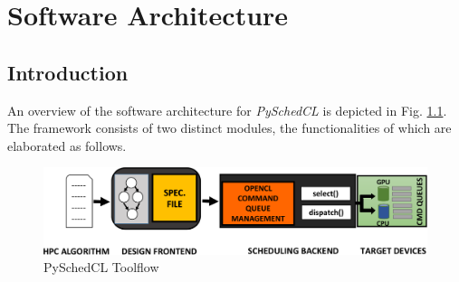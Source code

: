 
\chapter{Software Architecture} %

\label{Chapter4} %


\section{Introduction}
An overview of the software architecture for {\em PySchedCL} is depicted in Fig. \ref{fig:pyschedcl}. The framework consists of two distinct modules, the functionalities of which are elaborated as follows.
	\begin{figure}[ht]  
		\centering
		\includegraphics[scale=0.50]{Pictures/TCOverviewNonML.pdf}
		\caption{PySchedCL Toolflow\label{fig:pyschedcl}}
	\end{figure}
